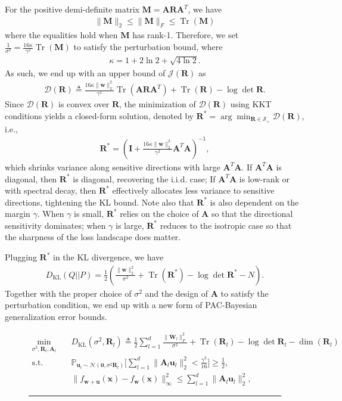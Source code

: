 \documentclass[journal]{IEEEtran} %
\def\vzero{{\bm{0}}}
\def\vu{{\bm{u}}}
\def\vw{{\bm{w}}}
\def\vx{{\bm{x}}}
\def\mA{{\bm{A}}}
\def\mI{{\bm{I}}}
\def\mM{{\bm{M}}}
\def\mR{{\bm{R}}}
\def\mW{{\bm{W}}}
\def\gD{{\mathcal{D}}}
\def\gJ{{\mathcal{J}}}
\def\gN{{\mathcal{N}}}
\def\gS{{\mathcal{S}}}
\newcommand{\KL}{D_{\mathrm{KL}}}
\newcommand{\Norm}[1]{\|#1\|}
\DeclareMathOperator{\Tr}{Tr}
\begin{document}
%  
For the positive demi-definite matrix $\mM=\mA \mR \mA^T$, we have
\begin{align}
    \Norm{\mM}_2 \le \Norm{\mM}_F \le \Tr(\mM)
\end{align}
where the equalities hold when $\mM$ has rank-1.
% 
Therefore, we set $\frac{1}{\sigma^2}=\frac{16 \kappa}{\gamma^2} \Tr(\mM)$ to satisfy the perturbation bound, where 
\begin{align}
    \kappa=1+2\ln2 + \sqrt{4\ln2}.
\end{align}
As such, we end up with an upper bound of $\gJ(\mR)$ as
\begin{align*} 
\gD(\mR) \triangleq \frac{16 \kappa\Norm{\vw}_2^2}{\gamma^2} \Tr(\mA \mR \mA^T) + \Tr(\mR) - \log \det \mR.
\end{align*}
 Since $\gD(\mR)$ is convex over $\mR$, the minimization of $\gD(\mR)$ using KKT conditions yields a closed-form solution, denoted by $\mR^*=\arg \min_{\mR \in \gS_{+}} \gD(\mR)$, i.e.,
\begin{align}
    \mR^* = \left(\mI + \frac{16 \kappa\Norm{\vw}_2^2}{\gamma^2} \mA^T \mA  \right)^{-1},
\end{align}
which shrinks variance along sensitive directions with large $\mA^T \mA$. 
If $\mA^T \mA$ is diagonal, then $\mR^*$ is diagonal, recovering the i.i.d. case; If $\mA^T \mA$ is low-rank or with spectral decay, then $\mR^*$ effectively allocates less variance to sensitive directions, tightening the KL bound.  
Note also that $\mR^*$ is also dependent on the margin $\gamma$. When $\gamma$ is small, $\mR^*$ relies on the choice of $\mA$ so that the directional sensitivity dominates; when $\gamma$ is large, $\mR^*$ reduces to the isotropic case so that the sharpness of the loss landscape does matter.

Plugging $\mR^*$ in the KL divergence, we have
\begin{align}
    \KL(Q||P) = \frac{1}{2} \left( \frac{\Norm{\vw}_2^2}{\sigma^2} + \Tr(\mR^*) - \log \det \mR^* - N \right). 
\end{align}
Together with the proper choice of $\sigma^2$ and the design of $\mA$ to satisfy the perturbation condition, we end up with a new form of PAC-Bayesian generalization error bounds.


\begin{figure}
\begin{subequations} \label{eq:main-opt}
\begin{align} 
    \min_{\sigma^2, \mR_l, \mA_l} \quad & \KL(\sigma^2,\mR_l) \triangleq \frac{1}{2} \sum_{l=1}^d\frac{\|\mW_l\|_F^2}{\sigma^2} + \Tr(\mR_l) - \log \det \mR_l - \dim(\mR_l)\label{eq:main-opt-obj}\\
    \mathrm{s.t.} \quad & \mathbb{P}_{\vu_l \sim \gN(\vzero,\sigma^2 \mR_l)} \Big[\sum_{l=1}^d \Norm{\mA_l \vu_l}_2^2 < \frac{\gamma^2}{16} \Big] \ge \frac{1}{2},\label{eq:perb-cond}\\
    &\|f_{\vw+\vu}(\vx)-f_{\vw}(\vx)\|_{\infty}^2 \le \sum_{l=1}^d\|\mA_l \vu_l\|_2^2, \label{eq:perb-bound}
\end{align}
\end{subequations}
\hrule
\end{figure}
\end{document}
